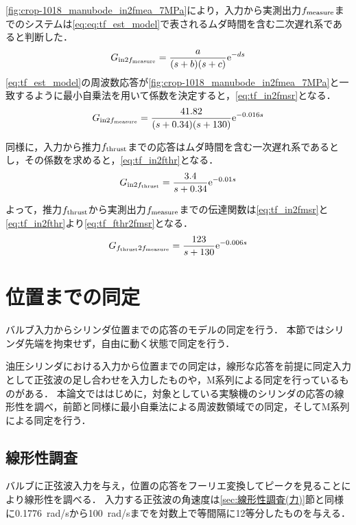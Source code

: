 \figname\ref{fig:crop-1018_manubode_in2fmea_7MPa}により，入力から実測出力$f_\mathrm{measure}$までのシステムは\eqnname\ref{eq:eq:tf_est_model}で表されるムダ時間を含む二次遅れ系であると判断した．
\begin{align}
    \label{eq:tf_est_model}
    G_{\mathrm{in}2f_\mathrm{measure}} = \frac{a}{(s+b)(s+c)}\mathrm{e}^{-ds}
\end{align}
\eqnname\ref{eq:tf_est_model}の周波数応答が\figname\ref{fig:crop-1018_manubode_in2fmea_7MPa}と一致するように最小自乗法を用いて係数を決定すると，\eqnname\ref{eq:tf_in2fmsr}となる．
\begin{align}
    \label{eq:tf_in2fmsr}
    G_{\mathrm{in}2f_\mathrm{measure}} = \frac{41.82}{(s+0.34)(s+130)}\mathrm{e}^{-0.016s}
\end{align}

同様に，入力から推力$f_\mathrm{thrust}$までの応答はムダ時間を含む一次遅れ系であるとし，その係数を求めると，\eqnname\ref{eq:tf_in2fthr}となる．
\begin{align}
    \label{eq:tf_in2fthr}
    G_{\mathrm{in}2f_\mathrm{thrust}} = \frac{3.4}{s+0.34}\mathrm{e}^{-0.01s}
\end{align}

よって，推力$f_\mathrm{thrust}$から実測出力$f_\mathrm{measure}$までの伝達関数は\eqnname\ref{eq:tf_in2fmsr}と\eqnname\ref{eq:tf_in2fthr}より\eqnname\ref{eq:tf_fthr2fmsr}となる．
\begin{align}
    \label{eq:tf_fthr2fmsr}
    G_{f_\mathrm{thrust}2f_\mathrm{measure}} = \frac{123}{s+130}\mathrm{e}^{-0.006s}
\end{align}
\section{位置までの同定}
バルブ入力からシリンダ位置までの応答のモデルの同定を行う．
本節ではシリンダ先端を拘束せず，自由に動く状態で同定を行う．

油圧シリンダにおける入力から位置までの同定は，線形な応答を前提に同定入力として正弦波の足し合わせを入力したもの\cite{}や，M系列による同定を行っているもの\cite{}がある．
本論文でははじめに，対象としている実験機のシリンダの応答の線形性を調べ，前節と同様に最小自乗法による周波数領域での同定，そしてM系列による同定を行う．
\subsection{線形性調査}
バルブに正弦波入力を与え，位置の応答をフーリエ変換してピークを見ることにより線形性を調べる．
入力する正弦波の角速度は\ref{sec:線形性調査(力)}節と同様に\SI{0.1776}{rad/s}から\SI{100}{rad/s}までを対数上で等間隔に12等分したものを与える．

